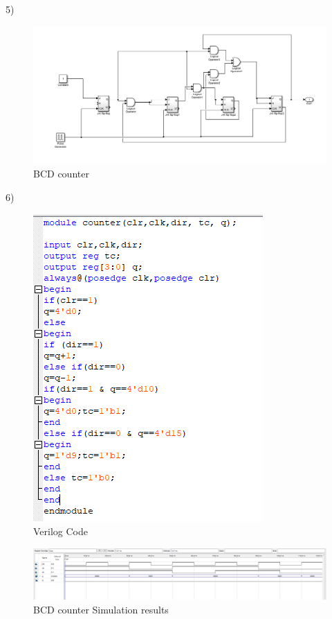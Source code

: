\documentclass[11pt]{report}
\begin{document}
5)
\begin{figure}[H]
  \includegraphics[width=\linewidth]{five}
  \caption{BCD counter}
  \label{fig:zero}
\end{figure}
6)
\begin{figure}[H]
  \includegraphics[scale=0.7]{v}
  \caption{Verilog Code}
  \label{fig:zero}
\end{figure}

\begin{figure}[H]
  \includegraphics[width=\linewidth]{cooonter1}
  \caption{BCD counter Simulation results}
  \label{fig:zero}
\end{figure}
\end{document}
